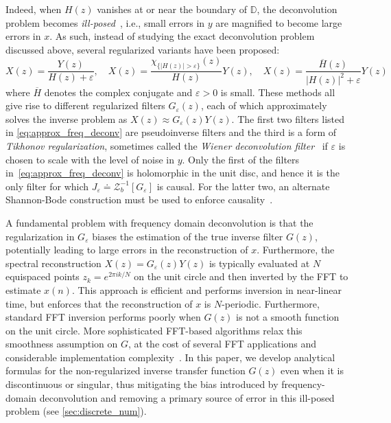 \documentclass{cams-l} %
\newcommand{\dave}[1]{#1}\newcommand{\davebegin}{}\newcommand{\daveend}{}\newcommand{\george}[1]{#1}
\newcommand{\DD}{\mathbb D}
\newcommand{\cZ}{\mathcal Z}
\newcommand{\eps}{\varepsilon}
\theoremstyle{definition}
\theoremstyle{remark}
\numberwithin{equation}{section}
\begin{document}
\dave{Indeed, when $H(z)$ vanishes at or near the boundary of $\DD$, the deconvolution problem becomes \emph{ill-posed}~\cite{riad1986deconvolution, brown2012introduction}, i.e., small errors in $y$ are magnified to become large errors in $x$. As such, instead of studying the exact deconvolution problem discussed above, several regularized variants have been proposed:
\begin{equation}\label{eq:approx_freq_deconv}
    X(z) = \frac{Y(z)}{H(z) + \varepsilon}, \quad X(z) = \frac{\chi_{\{|H(z)| > \varepsilon\}}(z)}{H(z)}Y(z), \quad X(z) = \frac{\overline{H}(z)}{|H(z)|^2 + \varepsilon}Y(z)
\end{equation}
where $\overline{H}$ denotes the complex conjugate and $\eps>0$ is small.} These methods all give rise to different regularized filters $G_\varepsilon(z)$, each of which approximately solves the inverse problem as $X(z) \approx G_\varepsilon(z)Y(z)$. The first two filters listed in \cref{eq:approx_freq_deconv} are pseudoinverse filters and the third is a form of \emph{Tikhonov regularization}, sometimes called the \textit{Wiener deconvolution filter}~\cite{brown2012introduction} if $\varepsilon$ is chosen to scale with the level of noise in $y$. Only the first of the filters in~\cref{eq:approx_freq_deconv} is holomorphic in the unit disc, and hence it is the only filter for which $J_\varepsilon \doteq \cZ_b^{-1}[G_\varepsilon]$ is causal. \dave{For the latter two, an alternate Shannon-Bode construction must be used to enforce causality~\cite{kailath1980linear}}.

A fundamental problem with frequency domain deconvolution is that the regularization in $G_\varepsilon$ biases the estimation of the true inverse filter $G(z)$, potentially leading to large errors in the reconstruction of $x$. Furthermore, the spectral reconstruction $X(z) = G_\varepsilon(z)Y(z)$ is typically evaluated at $N$ equispaced points $z_k = e^{2\pi ik/N}$ on the unit circle and then inverted by the FFT to estimate $x(n)$. This approach is efficient and performs inversion in near-linear time, but \dave{enforces that the reconstruction of $x$ is $N$-periodic}. Furthermore, \dave{standard} FFT inversion performs poorly when $G(z)$ is not a smooth function on the unit circle. \dave{More sophisticated FFT-based algorithms relax this smoothness assumption on $G$, at the cost of several FFT applications and considerable implementation complexity~\cite{commenges1984fast,chandrasekaran2008superfast, LIN2004511}}. In this paper, we develop analytical formulas for the non-regularized inverse transfer function $G(z)$ \dave{even when it is discontinuous or singular, thus mitigating the bias introduced by frequency-domain deconvolution and removing a primary source of error in this ill-posed problem (see \cref{sec:discrete_num}).}
\end{document}
